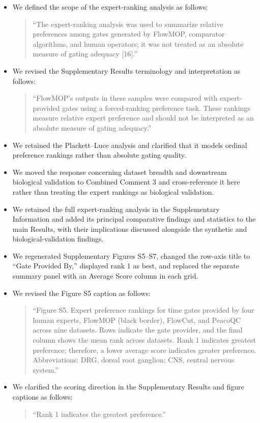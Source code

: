 \documentclass[
  11pt,
  a4paper,
]{article}
\begin{document}
\begin{itemize}
\item
  We defined the scope of the expert-ranking analysis as follows:

  \begin{quote}
  ``The expert-ranking analysis was used to summarize relative
  preferences among gates generated by FlowMOP, comparator algorithms,
  and human operators; it was not treated as an absolute measure of
  gating adequacy {[}16{]}.''
  \end{quote}
\item
  We revised the Supplementary Results terminology and interpretation as
  follows:

  \begin{quote}
  ``FlowMOP's outputs in these samples were compared with
  expert-provided gates using a forced-ranking preference task. These
  rankings measure relative expert preference and should not be
  interpreted as an absolute measure of gating adequacy.''
  \end{quote}
\item
  We retained the Plackett--Luce analysis and clarified that it models
  ordinal preference rankings rather than absolute gating quality.
\item
  We moved the response concerning dataset breadth and downstream
  biological validation to Combined Comment 3 and cross-reference it
  here rather than treating the expert rankings as biological
  validation.
\item
  We retained the full expert-ranking analysis in the Supplementary
  Information and added its principal comparative findings and
  statistics to the main Results, with their implications discussed
  alongside the synthetic and biological-validation findings.
\item
  We regenerated Supplementary Figures S5--S7, changed the row-axis
  title to ``Gate Provided By,'' displayed rank 1 as best, and replaced
  the separate summary panel with an Average Score column in each grid.
\item
  We revised the Figure S5 caption as follows:

  \begin{quote}
  ``Figure S5. Expert preference rankings for time gates provided by
  four human experts, FlowMOP (black border), FlowCut, and PeacoQC
  across nine datasets. Rows indicate the gate provider, and the final
  column shows the mean rank across datasets. Rank 1 indicates greatest
  preference; therefore, a lower average score indicates greater
  preference. Abbreviations: DRG, dorsal root ganglion; CNS, central
  nervous system.''
  \end{quote}
\item
  We clarified the scoring direction in the Supplementary Results and
  figure captions as follows:

  \begin{quote}
  ``Rank 1 indicates the greatest preference.''
  \end{quote}
\end{itemize}
\end{document}
